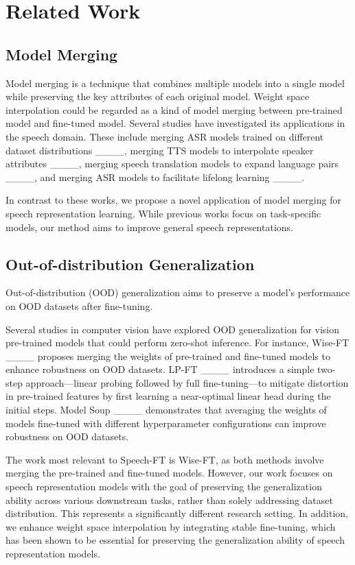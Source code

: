 \section{Related Work}
\subsection{Model Merging}
Model merging is a technique that combines multiple models into a single model while preserving the key attributes of each original model. 
Weight space interpolation could be regarded as a kind of model merging between pre-trained model and fine-tuned model.
Several studies have investigated its applications in the speech domain. These include merging ASR models trained on different dataset distributions ____, merging TTS models to interpolate speaker attributes ____, merging speech translation models to expand language pairs ____, and merging ASR models to facilitate lifelong learning ____.

In contrast to these works, we propose a novel application of model merging for speech representation learning. While previous works focus on task-specific models, our method aims to improve general speech representations. 

\subsection{Out-of-distribution Generalization}
Out-of-distribution (OOD) generalization aims to preserve a model's performance on OOD datasets after fine-tuning. 

Several studies in computer vision have explored OOD generalization for vision pre-trained models that could perform zero-shot inference.
For instance, Wise-FT ____ proposes merging the weights of pre-trained and fine-tuned models to enhance robustness on OOD datasets. 
LP-FT ____ introduces a simple two-step approach—linear probing followed by full fine-tuning—to mitigate distortion in pre-trained features by first learning a near-optimal linear head during the initial steps.
Model Soup ____ demonstrates that averaging the weights of models fine-tuned with different hyperparameter configurations can improve robustness on OOD datasets. 

The work most relevant to Speech-FT is Wise-FT, as both methods involve merging the pre-trained and fine-tuned models.  
However, our work focuses on speech representation models with the goal of preserving the generalization ability across various downstream tasks, rather than solely addressing dataset distribution. This represents a significantly different research setting.
In addition, we enhance weight space interpolation by integrating stable fine-tuning, which has been shown to be essential for preserving the generalization ability of speech representation models.

